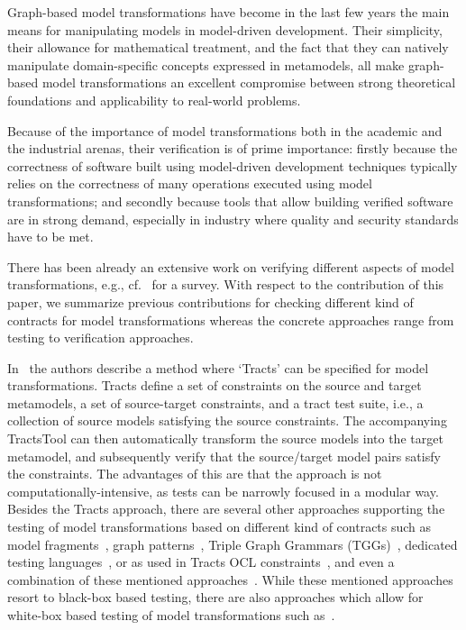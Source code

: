 Graph-based model transformations have become in the last few years the main means for manipulating models in model-driven development. Their simplicity, their allowance for mathematical treatment, and the fact that they can natively manipulate domain-specific concepts expressed in metamodels, all make graph-based model transformations an excellent compromise between strong theoretical foundations and applicability to real-world problems.

Because of the importance of model transformations both in the academic and the industrial arenas, their verification is of prime importance: firstly because the correctness of software built using model-driven development techniques typically relies on the correctness of many operations executed using model transformations; and secondly because tools that allow building verified software are in strong demand, especially in industry where quality and security standards have to be met.

There has been already an extensive work on verifying different aspects of model transformations, e.g., cf.~\cite{AmraniLSCDVTC12} for a survey.
With respect to the contribution of this paper, we summarize previous contributions for checking different kind of contracts for model transformations whereas the concrete approaches range from testing to verification approaches.

In~\cite{Gogolla2011,Vallecillo2012} the authors describe a method where `Tracts' can be specified for model transformations. Tracts define a set of constraints on the source and target metamodels, a set of source-target constraints, and a tract test suite, i.e., a collection of source models satisfying the source constraints. The accompanying TractsTool can then automatically transform the source models into the target metamodel, and subsequently verify that the source/target model pairs satisfy the constraints. The advantages of this are that the approach is not computationally-intensive, as tests can be narrowly focused in a modular way. Besides the Tracts approach, there are several other approaches supporting the testing of model transformations based on different kind of contracts such as model fragments~\cite{Mottu2008}, graph patterns~\cite{Guerra12,BaloghBCGHMPPRVa10}, Triple Graph Grammars (TGGs)~\cite{WieberAS14}, dedicated testing languages~\cite{Kolovos06,Garcia-Dominguez11}, or as used in Tracts OCL constraints~\cite{Cariou09}, and even a combination of these mentioned approaches~\cite{Pele}. While these mentioned approaches
resort to black-box based testing, there are also approaches which allow for white-box based testing of model transformations such as~\cite{GonzalezC12}.

